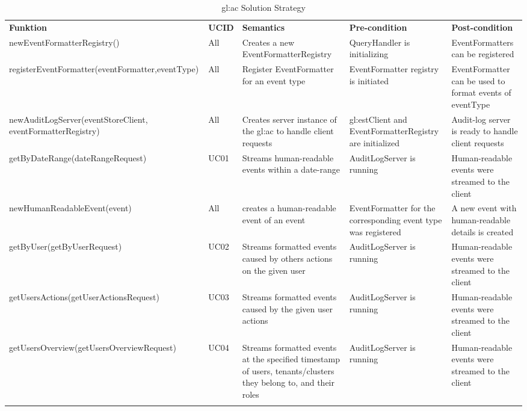 \def\arraystretch{1.5}
\begin{xltabular}[H]{\linewidth}{|X l X X X |}
  \hline
  \textbf{Funktion} & \textbf{UCID} & \textbf{Semantics} & \textbf{Pre-condition} & \textbf{Post-condition}\\
  
  new\-Event\-Formatter\-Registry\-() & All & Creates a new EventFormatterRegistry & QueryHandler is initializing & EventFormatters can be registered \\

  register\-Event\-Formatter(\-eventFormatter,\-eventType\-) & All & Register EventFormatter for an event type & EventFormatter registry is initiated & EventFormatter can be used to format events of eventType \\

  new\-Audit\-Log\-Server\-(event\-Store\-Client, event\-Formatter\-Registry) & All & Creates server instance of the \gls{gl:ac} to handle client requests & \gls{gl:est}Client and EventFormatterRegistry are initialized & Audit-log server is ready to handle client requests  \\

  get\-By\-Date\-Range(date\-Range\-Request) & UC01 & Streams human-readable events within a date-range & Audit\-Log\-Server is running & Human-readable events were streamed to the client  \\

  new\-Human\-Readable\-Event(\-event\-) & All & creates a human-readable event of an event & EventFormatter for the corresponding event type was registered & A new event with human-readable details is created \\

  get\-By\-User(get\-By\-User\-Request) & UC02 & Streams formatted events caused by others actions on the given user & Audit\-Log\-Server is running & Human-readable events were streamed to the client  \\

  get\-Users\-Actions(get\-User\-Actions\-Request) & UC03 & Streams formatted events caused by the given user actions & Audit\-Log\-Server is running & Human-readable events were streamed to the client  \\

  get\-Users\-Overview(get\-Users\-Overview\-Request) & UC04 & Streams formatted events at the specified timestamp of users, tenants/clusters they belong to, and their roles & Audit\-Log\-Server is running & Human-readable events were streamed to the client  \\

  \hline
  \caption{\gls{gl:ac} Solution Strategy\label{tab:acst}}\\
\end{xltabular}

